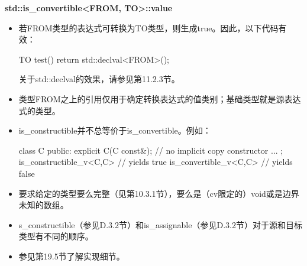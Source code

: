 \textbf{std::is\_convertible<FROM, TO>::value}

\begin{itemize}
\item
若FROM类型的表达式可转换为TO类型，则生成true。因此，以下代码有效：

\begin{cpp}
TO test() {
	return std::declval<FROM>();
}
\end{cpp}

\begin{notice}
关于std::declval的效果，请参见第11.2.3节。
\end{notice}

\item
类型FROM之上的引用仅用于确定转换表达式的值类别；基础类型就是源表达式的类型。

\item
is\_constructible并不总等价于is\_convertible。例如：

\begin{cpp}
class C {
	public:
	explicit C(C const&); // no implicit copy constructor
	...
};
is_constructible_v<C,C> // yields true
is_convertible_v<C,C> // yields false
\end{cpp}

\item
要求给定的类型要么完整（见第10.3.1节），要么是（cv限定的）void或是边界未知的数组。

\item
s\_constructible（参见D.3.2节）和is\_assignable（参见D.3.2节）对于源和目标类型有不同的顺序。

\item
参见第19.5节了解实现细节。
\end{itemize}